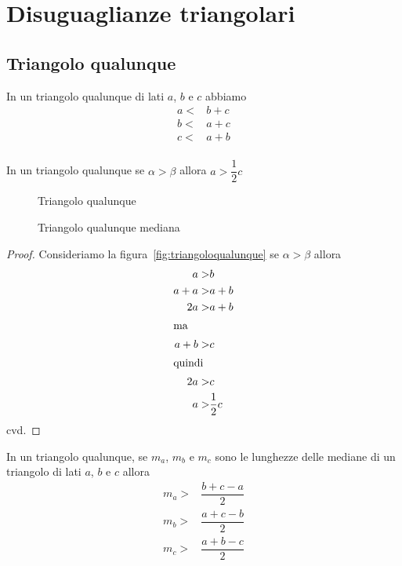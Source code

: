 \chapter{Disuguaglianze triangolari}
\section{Triangolo qualunque}
\begin{thm}\label{thm:disuguaglianza_triangolare}
	In un triangolo qualunque  di lati $a$, $b$ e $c$ abbiamo
	\begin{align*}
		a<&b+c\\
		b<&a+c\\
		c<&a+b\\
	\end{align*}
\end{thm}
\begin{thm}\label{thm:triangolo_qualunque}
In un triangolo qualunque se $\alpha > \beta$ allora $a>\dfrac{1}{2}c$
\end{thm}
\begin{figure}
	\centering
	
	\caption{Triangolo qualunque}
	\label{fig:triangoloqualunque}
\end{figure}
\begin{figure}
	\centering
	
	\caption{Triangolo qualunque mediana}
	\label{fig:triangoloqualunquemediana}
\end{figure}
\begin{proof}
	Consideriamo la figura~\vref{fig:triangoloqualunque} se  $\alpha > \beta$ allora 
	\begin{align*}
		a>&b\\
			a+a>&a+b\\
			2a>&a+b\\
			\intertext{ma}
			a+b>&c\\
			\intertext{quindi}
				2a>&c\\
				a>&\dfrac{1}{2}c
	\end{align*}
cvd.
\end{proof}
\begin{thm}\label{thm:triangolo_qualunque_mediana}
	In un triangolo qualunque, se $m_a$, $m_b$ e $m_c$ sono le lunghezze delle mediane  di un triangolo di lati $a$, $b$ e $c$ allora
	\begin{align*}
		m_a>&\dfrac{b+c-a}{2}\\
		m_b>&\dfrac{a+c-b}{2}\\
		m_c>&\dfrac{a+b-c}{2}\\
	\end{align*}
\end{thm}
